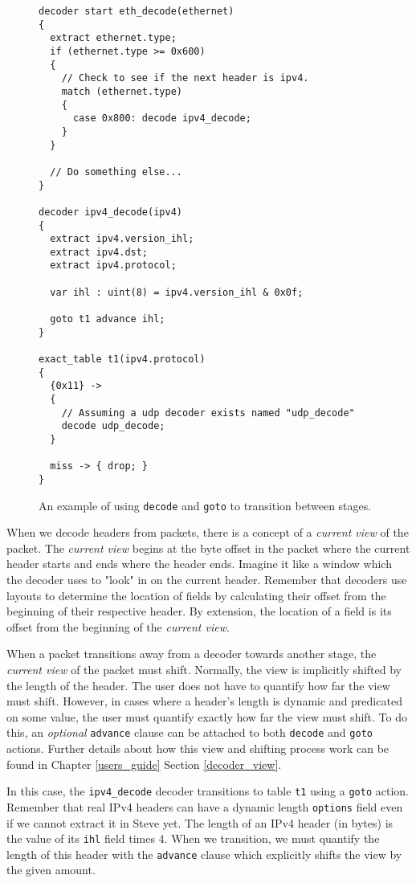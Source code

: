 \begin{figure}
\begin{lstlisting}
decoder start eth_decode(ethernet)
{
  extract ethernet.type;
  if (ethernet.type >= 0x600) 
  {
  	// Check to see if the next header is ipv4.
    match (ethernet.type)
    {
      case 0x800: decode ipv4_decode;
    }
  }
  
  // Do something else...
}

decoder ipv4_decode(ipv4)
{
  extract ipv4.version_ihl;
  extract ipv4.dst;
  extract ipv4.protocol;
  
  var ihl : uint(8) = ipv4.version_ihl & 0x0f;
  
  goto t1 advance ihl;
}

exact_table t1(ipv4.protocol)
{
  {0x11} ->
  {
    // Assuming a udp decoder exists named "udp_decode"
    decode udp_decode;
  }
  
  miss -> { drop; }
}
\end{lstlisting}
\caption{An example of using \texttt{decode} and \texttt{goto} to transition between stages.}
\label{fg:transition_ex}
\end{figure}

When we decode headers from packets, there is a concept of a \textit{current view} of the packet. The \textit{current view} begins at the byte offset in the packet where the current header starts and ends where the header ends. Imagine it like a window which the decoder uses to "look" in on the current header. Remember that decoders use layouts to determine the location of fields by calculating their offset from the beginning of their respective header. By extension, the location of a field is its offset from the beginning of the \textit{current view}. 

When a packet transitions away from a decoder towards another stage, the \textit{current view} of the packet must shift. Normally, the view is implicitly shifted by the length of the header. The user does not have to quantify how far the view must shift. However, in cases where a header's length is dynamic and predicated on some value, the user must quantify exactly how far the view must shift. To do this, an \textit{optional} \texttt{advance} clause can be attached to both \texttt{decode} and \texttt{goto} actions. Further details about how this view and shifting process work can be found in Chapter \ref{users_guide} Section \ref{decoder_view}.

In this case, the \texttt{ipv4\_decode} decoder transitions to table \texttt{t1} using a \texttt{goto} action. Remember that real IPv4 headers can have a dynamic length \texttt{options} field even if we cannot extract it in Steve yet. The length of an IPv4 header (in bytes) is the value of its \texttt{ihl} field times 4. When we transition, we must quantify the length of this header with the \texttt{advance} clause which explicitly shifts the view by the given amount.

